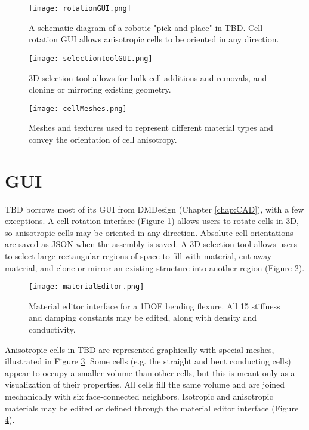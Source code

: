 {\begin{figure}
  \texttt{[image: rotationGUI.png]}
  \caption{A schematic diagram of a robotic "pick and place" in TBD.  Cell rotation GUI allows anisotropic cells to be oriented in any direction.}
  \label{fig:rotationGUI}
\end{figure}

\begin{figure}
  \texttt{[image: selectiontoolGUI.png]}
  \caption{3D selection tool allows for bulk cell additions and removals, and cloning or mirroring existing geometry.}
  \label{fig:selectiontoolGUI}
\end{figure}

\begin{figure}
  \texttt{[image: cellMeshes.png]}
  \caption{Meshes and textures used to represent different material types and convey the orientation of cell anisotropy.}
  \label{fig:cellMeshes}
\end{figure}

\section{GUI}

TBD borrows most of its GUI from DMDesign (Chapter \ref{chap:CAD}), with a few exceptions.  A cell rotation interface (Figure \ref{fig:rotationGUI}) allows users to rotate cells in 3D, so anisotropic cells may be oriented in any direction.  Absolute cell orientations are saved as JSON when the assembly is saved.  A 3D selection tool allows users to select large rectangular regions of space to fill with material, cut away material, and clone or mirror an existing structure into another region (Figure \ref{fig:selectiontoolGUI}).\\

\begin{figure}
  \texttt{[image: materialEditor.png]}
  \caption{Material editor interface for a 1DOF bending flexure.  All 15 stiffness and damping constants may be edited, along with density and conductivity.}
  \label{fig:materialEditor}
\end{figure}

Anisotropic cells in TBD are represented graphically with special meshes, illustrated in Figure \ref{fig:cellMeshes}.  Some cells (e.g. the straight and bent conducting cells) appear to occupy a smaller volume than other cells, but this is meant only as a visualization of their properties.  All cells fill the same volume and are joined mechanically with six face-connected neighbors.  Isotropic and anisotropic materials may be edited or defined through the material editor interface (Figure \ref{fig:materialEditor}).\\

}
